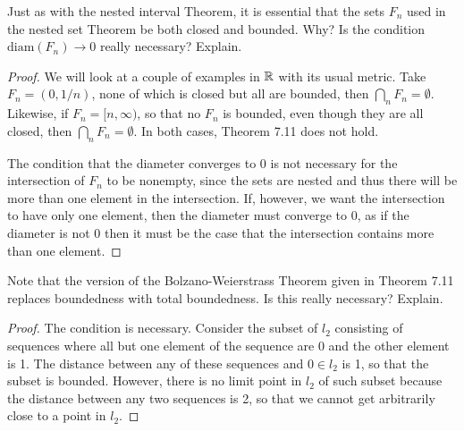 \begin{exercise}{26}
Just as with the nested interval Theorem, it is essential that the sets $F_n$ used in the nested set Theorem be both closed and bounded.
Why?
Is the condition $\text{diam}(F_n)\to 0$ really necessary?
Explain.
\end{exercise}
\begin{proof}
We will look at a couple of examples in $\mathbb{R}$ with its usual metric.
Take $F_n=(0,1/n)$, none of which is closed but all are bounded, then $\bigcap_n F_n =\emptyset$.
Likewise, if $F_n=[n,\infty)$, so that no $F_n$ is bounded, even though they are all closed, then $\bigcap_nF_n=\emptyset$.
In  both cases, Theorem 7.11 does not hold.

The condition that the diameter converges to 0 is not necessary for the intersection of $F_n$ to be nonempty, since the sets are nested and thus there will be more than one element in the intersection. 
If, however, we want the intersection to have only one element, then the diameter must converge to 0, as if the diameter is not 0 then it must be the case that the intersection contains more than one element.
\end{proof} 

\begin{exercise}{27}
Note that the version of the Bolzano-Weierstrass Theorem given in Theorem 7.11 replaces boundedness with total boundedness.
Is this really necessary?
Explain.
\end{exercise}
\begin{proof}
The condition is necessary.
Consider the subset of $l_2$ consisting of sequences where all but one element of the sequence are 0 and the other element is 1.
The distance between any of these sequences and $0\in l_2$ is 1, so that the subset is bounded.
However,  there is no limit point in $l_2$ of such subset because the distance between any two sequences is 2, so that we cannot get arbitrarily close to a point in $l_2$.
\end{proof} 

